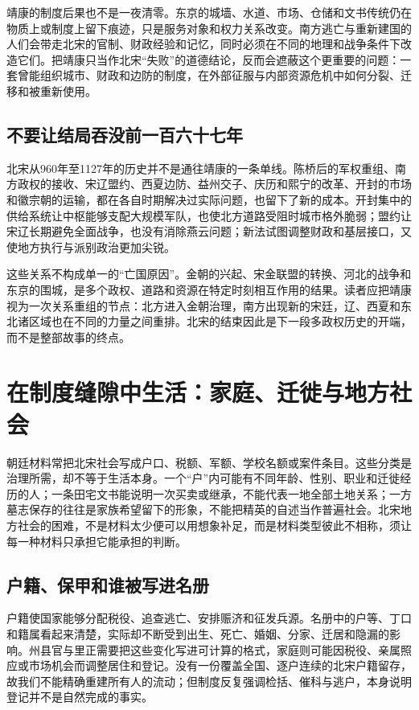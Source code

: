 靖康的制度后果也不是一夜清零。东京的城墙、水道、市场、仓储和文书传统仍在物质上或制度上留下痕迹，只是服务对象和权力关系改变。南方逃亡与重新建国的人们会带走北宋的官制、财政经验和记忆，同时必须在不同的地理和战争条件下改造它们。把靖康只当作北宋“失败”的道德结论，反而会遮蔽这个更重要的问题：一套曾能组织城市、财政和边防的制度，在外部征服与内部资源危机中如何分裂、迁移和被重新使用。

\subsection{不要让结局吞没前一百六十七年}

北宋从960年至1127年的历史并不是通往靖康的一条单线。陈桥后的军权重组、南方政权的接收、宋辽盟约、西夏边防、益州交子、庆历和熙宁的改革、开封的市场和徽宗朝的运输，都在各自时期解决过实际问题，也留下了新的成本。开封集中的供给系统让中枢能够支配大规模军队，也使北方道路受阻时城市格外脆弱；盟约让宋辽长期避免全面战争，也没有消除燕云问题；新法试图调整财政和基层接口，又使地方执行与派别政治更加尖锐。

这些关系不构成单一的“亡国原因”。金朝的兴起、宋金联盟的转换、河北的战争和东京的围城，是多个政权、道路和资源在特定时刻相互作用的结果。读者应把靖康视为一次关系重组的节点：北方进入金朝治理，南方出现新的宋廷，辽、西夏和东北诸区域也在不同的力量之间重排。北宋的结束因此是下一段多政权历史的开端，而不是整部故事的终点。

\section{在制度缝隙中生活：家庭、迁徙与地方社会}

朝廷材料常把北宋社会写成户口、税额、军额、学校名额或案件条目。这些分类是治理所需，却不等于生活本身。一个“户”内可能有不同年龄、性别、职业和迁徙经历的人；一条田宅文书能说明一次买卖或继承，不能代表一地全部土地关系；一方墓志保存的往往是家族希望留下的形象，不能把精英的自述当作普遍社会。北宋地方社会的困难，不是材料太少便可以用想象补足，而是材料类型彼此不相称，须让每一种材料只承担它能承担的判断。

\subsection{户籍、保甲和谁被写进名册}

户籍使国家能够分配税役、追查逃亡、安排赈济和征发兵源。名册中的户等、丁口和籍属看起来清楚，实际却不断受到出生、死亡、婚姻、分家、迁居和隐漏的影响。州县官与里正需要把这些变化写进可计算的格式，家庭则可能因税役、亲属照应或市场机会而调整居住和登记。没有一份覆盖全国、逐户连续的北宋户籍留存，故我们不能精确重建所有人的流动；但制度反复强调检括、催科与逃户，本身说明登记并不是自然完成的事实。

